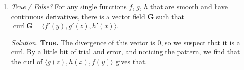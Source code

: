 \documentclass{article}
\DeclareMathOperator{\curl}{curl}
\begin{document}
\begin{enumerate}
{\em Solution.} {\bf True.} The path can be split into three parts, the upper lobe, the center lobe, and the lower lobe. Only the center lobe of the graph contributes to the integral, and it is counterclockwise, so the integral is $2\pi$.

\item {\em True / False?} For any single functions $f$, $g$, $h$ that are smooth and have continuous derivatives, there is a vector field $\mathbf{G}$ such that $\curl \mathbf{G} = \langle f'(y), g'(z), h'(x) \rangle$.

{\em Solution.} {\bf True.} The divergence of this vector is $0$, so we suspect that it is a curl. By a little bit of trial and error, and noticing the pattern, we find that the curl of $\langle g(z), h(x), f(y) \rangle$ gives that.
\end{enumerate}
\end{document}
